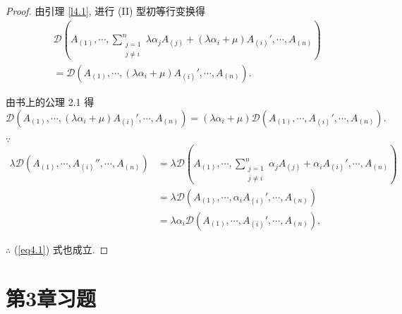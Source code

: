 \documentclass[color=black,device=normal,lang=cn,mode=geye]{elegantnote}
\begin{document}
\begin{proof}
    由引理 \ref{l4.1}, 进行 (II) 型初等行变换得
    \begin{align*}
        & \mathcal{D}\left(A_{(1)},\cdots,\sum\limits_{\substack{j=1\\j\neq i}}^{n}\lambda\alpha_jA_{(j)}+(\lambda\alpha_i+\mu)A_{(i)}',\cdots,A_{(n)}\right) \\
        & =\mathcal{D}\left(A_{(1)},\cdots,(\lambda\alpha_i+\mu)A_{(i)}',\cdots,A_{(n)}\right).
    \end{align*}

    由书上的公理 2.1 得
    \[\mathcal{D}\left(A_{(1)},\cdots,(\lambda\alpha_i+\mu)A_{(i)}',\cdots,A_{(n)}\right)=(\lambda\alpha_i+\mu)\mathcal{D}\left(A_{(1)},\cdots,A_{(i)}',\cdots,A_{(n)}\right).\]

    $\because$
    \begin{align*}
        \lambda\mathcal{D}(A_{(1)},\cdots,A_{(i)}'',\cdots,A_{(n)}) & =\lambda\mathcal{D}\left(A_{(1)},\cdots,\sum\limits_{\substack{j=1\\j\neq i}}^{n}\alpha_jA_{(j)}+\alpha_iA_{(i)}',\cdots,A_{(n)}\right) \\
        & =\lambda\mathcal{D}\left(A_{(1)},\cdots,\alpha_iA_{(i)}',\cdots,A_{(n)}\right) \\
        & =\lambda\alpha_i\mathcal{D}\left(A_{(1)},\cdots,A_{(i)}',\cdots,A_{(n)}\right),
    \end{align*}

    $\therefore$ (\ref{eq4.1}) 式也成立.
\end{proof}
\section{第3章习题}
\end{document}
